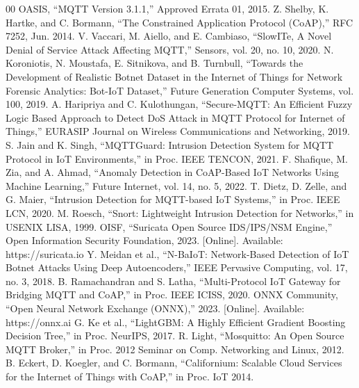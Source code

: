 \documentclass[conference]{IEEEtran}
\begin{document}
\begin{thebibliography}{00}
 OASIS, ``MQTT Version 3.1.1,'' Approved Errata 01, 2015.
 Z. Shelby, K. Hartke, and C. Bormann, ``The Constrained Application Protocol (CoAP),'' RFC 7252, Jun. 2014.
 V. Vaccari, M. Aiello, and E. Cambiaso, ``SlowITe, A Novel Denial of Service Attack Affecting MQTT,'' Sensors, vol. 20, no. 10, 2020.
 N. Koroniotis, N. Moustafa, E. Sitnikova, and B. Turnbull, ``Towards the Development of Realistic Botnet Dataset in the Internet of Things for Network Forensic Analytics: Bot-IoT Dataset,'' Future Generation Computer Systems, vol. 100, 2019.
 A. Haripriya and C. Kulothungan, ``Secure-MQTT: An Efficient Fuzzy Logic Based Approach to Detect DoS Attack in MQTT Protocol for Internet of Things,'' EURASIP Journal on Wireless Communications and Networking, 2019.
 S. Jain and K. Singh, ``MQTTGuard: Intrusion Detection System for MQTT Protocol in IoT Environments,'' in Proc. IEEE TENCON, 2021.
 F. Shafique, M. Zia, and A. Ahmad, ``Anomaly Detection in CoAP-Based IoT Networks Using Machine Learning,'' Future Internet, vol. 14, no. 5, 2022.
 T. Dietz, D. Zelle, and G. Maier, ``Intrusion Detection for MQTT-based IoT Systems,'' in Proc. IEEE LCN, 2020.
 M. Roesch, ``Snort: Lightweight Intrusion Detection for Networks,'' in USENIX LISA, 1999.
 OISF, ``Suricata Open Source IDS/IPS/NSM Engine,'' Open Information Security Foundation, 2023. [Online]. Available: https://suricata.io
 Y. Meidan et al., ``N-BaIoT: Network-Based Detection of IoT Botnet Attacks Using Deep Autoencoders,'' IEEE Pervasive Computing, vol. 17, no. 3, 2018.
 B. Ramachandran and S. Latha, ``Multi-Protocol IoT Gateway for Bridging MQTT and CoAP,'' in Proc. IEEE ICISS, 2020.
 ONNX Community, ``Open Neural Network Exchange (ONNX),'' 2023. [Online]. Available: https://onnx.ai
 G. Ke et al., ``LightGBM: A Highly Efficient Gradient Boosting Decision Tree,'' in Proc. NeurIPS, 2017.
 R. Light, ``Mosquitto: An Open Source MQTT Broker,'' in Proc. 2012 Seminar on Comp. Networking and Linux, 2012.
 B. Eckert, D. Koegler, and C. Bormann, ``Californium: Scalable Cloud Services for the Internet of Things with CoAP,'' in Proc. IoT 2014.
\end{thebibliography}
\end{document}
